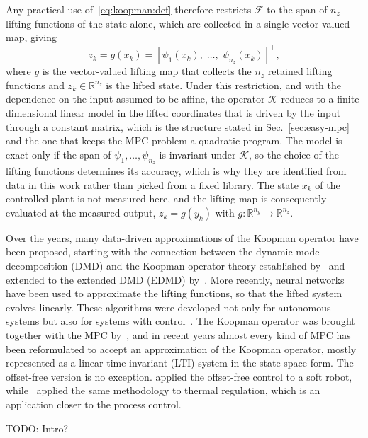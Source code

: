 \documentclass[preprint,12pt,authoryear]{elsarticle}
\theoremstyle{remark}
\newcommand{\todo}[1]{{{\color{red} TODO: #1	}} }
\begin{document}
Any practical use of~\eqref{eq:koopman:def} therefore restricts $\mathcal{F}$ to the span of $n_z$ lifting functions of the state alone, which are collected in a single vector-valued map, giving
\begin{equation}
  \label{eq:koopman:lift}
  z_k = g(x_k) = \left[ \psi_1(x_k),\; \ldots,\; \psi_{n_z}(x_k) \right]^\intercal,
\end{equation}
where $g$ is the vector-valued lifting map that collects the $n_z$ retained lifting functions and $z_k \in \mathbb{R}^{n_z}$ is the lifted state. Under this restriction, and with the dependence on the input assumed to be affine, the operator $\mathcal{K}$ reduces to a finite-dimensional linear model in the lifted coordinates that is driven by the input through a constant matrix, which is the structure stated in Sec.~\ref{sec:easy-mpc} and the one that keeps the MPC problem a quadratic program. The model is exact only if the span of $\psi_1, \ldots, \psi_{n_z}$ is invariant under $\mathcal{K}$, so the choice of the lifting functions determines its accuracy, which is why they are identified from data in this work rather than picked from a fixed library. The state $x_k$ of the controlled plant is not measured here, and the lifting map is consequently evaluated at the measured output, $z_k = g(y_k)$ with $g : \mathbb{R}^{n_y} \to \mathbb{R}^{n_z}$.


Over the years, many data-driven approximations of the Koopman operator have been proposed, starting with the connection between the dynamic mode decomposition (DMD) and the Koopman operator theory established by~\cite{rowley2009spectral} and extended to the extended DMD (EDMD) by~\cite{williams2015data}. More recently, neural networks have been used to approximate the lifting functions, so that the lifted system evolves linearly. These algorithms were developed not only for autonomous systems but also for systems with control~\citep{kaiser2021data}. The Koopman operator was brought together with the MPC by~\cite{korda2018linear}, and in recent years almost every kind of MPC has been reformulated to accept an approximation of the Koopman operator, mostly represented as a linear time-invariant (LTI) system in the state-space form. The offset-free version is no exception. \cite{chen2022offset} applied the offset-free control to a soft robot, while~\cite{pan2024offset} applied the same methodology to thermal regulation, which is an application closer to the process control.

\todo{Intro?}
\end{document}
